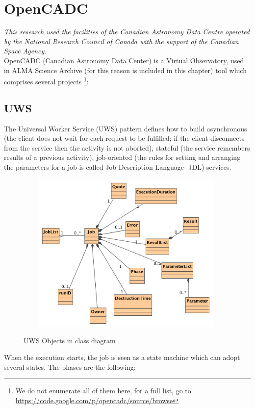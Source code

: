 \section{OpenCADC}

\textit{This research used the facilities of the Canadian Astronomy Data Centre operated 
by the National Research Council of Canada with the support of the Canadian Space Agency}.\\

OpenCADC (Canadian Astronomy Data Center) is a Virtual Observatory, used in ALMA Science Archive (for this reason is included in this chapter) tool which comprises several projects \footnote{We do not enumerate all of them here, for a full list, go to \url{https://code.google.com/p/opencadc/source/browse}}:

\subsection{UWS}

The Universal Worker Service (UWS) pattern defines how to build asynchronous (the client does not wait for each request to be fulfilled; if the client disconnects from the service then the activity is not aborted), stateful (the service remembers results of a previous activity), job-oriented (the rules for setting and arranging the parameters for a job is called Job Description Language- JDL) services.

\begin{figure}[H]
\centering
\includegraphics[width=11cm,height=8cm]{images/Class_Diagram__UWS__UWSObjects.png}\\
\caption{UWS Objects in class diagram}
\end{figure}

When the execution starts, the job is seen as a state machine which can adopt several states. The phases are the following:

